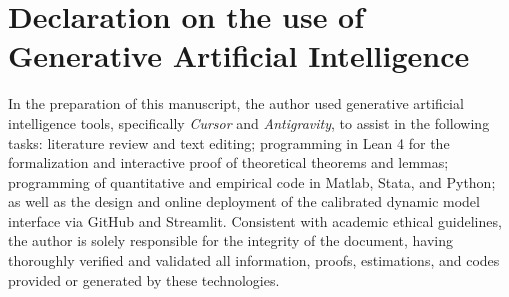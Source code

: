 \documentclass[ecta,nameyear,draft]{econsocart}
\theoremstyle{plain}
\theoremstyle{definition}
\newcommand{\1}{\mathbf{1}}
\begin{document}
\section*{Declaration on the use of Generative Artificial Intelligence}

In the preparation of this manuscript, the author used generative artificial intelligence tools, specifically \emph{Cursor} and \emph{Antigravity}, to assist in the following tasks: literature review and text editing; programming in Lean 4 for the formalization and interactive proof of theoretical theorems and lemmas; programming of quantitative and empirical code in Matlab, Stata, and Python; as well as the design and online deployment of the calibrated dynamic model interface via GitHub and Streamlit. Consistent with academic ethical guidelines, the author is solely responsible for the integrity of the document, having thoroughly verified and validated all information, proofs, estimations, and codes provided or generated by these technologies.




\end{document}
